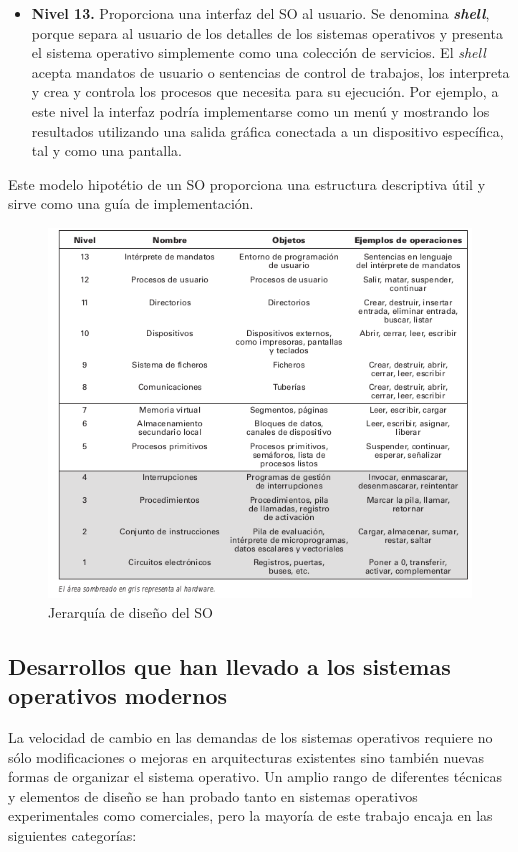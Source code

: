 \documentclass{article}
\begin{document}
\begin{itemize}
				\item \textbf{Nivel 13.} Proporciona una interfaz del SO al usuario. Se denomina \textbf{\textit{shell}}, porque separa al usuario de los detalles de los sistemas operativos y presenta el sistema operativo simplemente como una colección de servicios. El \textit{shell} acepta mandatos de usuario o sentencias de control de trabajos, los interpreta y crea y controla los procesos que necesita para su ejecución. Por ejemplo, a este nivel la interfaz podría implementarse como un menú y mostrando los resultados utilizando una salida gráfica conectada a un dispositivo específica, tal y como una pantalla.			
				\end{itemize}
				
				Este modelo hipotétio de un SO proporciona una estructura descriptiva útil y sirve como una guía de implementación. 
				
				\begin{figure}
				\caption{Jerarquía de diseño del SO}
				\label{figura21:jerarquiadiseño}
				\centering
				\includegraphics[width=1.1\textwidth, scale=1]{figura21.png}
				\end{figure}
				
			
		\subsection{Desarrollos que han llevado a los sistemas operativos modernos}
			La velocidad de cambio en las demandas de los sistemas operativos requiere no sólo modificaciones o mejoras en arquitecturas existentes sino también nuevas formas de organizar el sistema operativo. Un amplio rango de diferentes técnicas y elementos de diseño se han probado tanto en sistemas operativos experimentales como comerciales, pero la mayoría de este trabajo encaja en las siguientes categorías:
			
\end{document}
